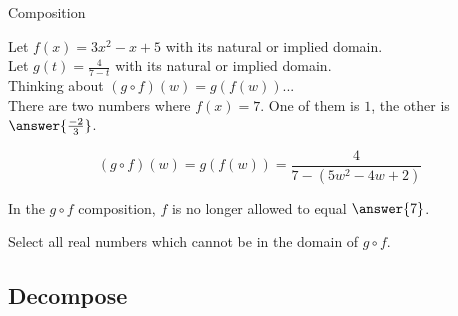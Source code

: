 \documentclass{ximera}
\begin{document}
\begin{example} Composition 



Let $f(x) = 3x^2 - x + 5$ with its natural or implied domain. \\
Let $g(t) = \frac{4}{7-t}$ with its natural or implied domain. \\



Thinking about $(g \circ f)(w) = g(f(w))$... \\

There are two numbers where $f(x) = 7$.  One of them is $1$, the other is $\answer{\frac{-2}{3}}$.






\[
(g \circ f)(w) = g(f(w)) = \frac{4}{7 - (5w^2 - 4w + 2)}
\]



In the $g \circ f$ composition, $f$ is no longer allowed to equal $\answer{7}$.

Select all real numbers which cannot be in the domain of $g \circ f$.

\begin{selectAll}
\end{selectAll}


\end{example}

























\subsection*{Decompose}
\end{document}
